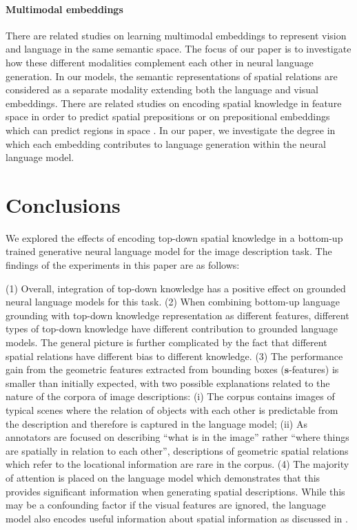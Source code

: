 \paragraph{Multimodal embeddings} %
There are related studies on learning multimodal embeddings
\cite{kiros2014multimodal,lazaridou2015combining} to represent vision
and language in the same semantic space.  The focus of our paper is
to investigate how these different modalities complement each other in
neural language generation. In our models, the semantic
representations of spatial relations are considered as a separate
modality extending both the language and visual embeddings.  There are
related studies on encoding spatial knowledge in feature space in
order to predict spatial prepositions \cite{ramisa2015combining} or on
prepositional embeddings which can predict regions in space
\cite{collell2018learning}.  In our paper, we investigate the degree
in which each embedding contributes to language generation within the
neural language model.



\section{Conclusions}\label{inlg2019:sec:conclusion}



We explored the effects of encoding top-down spatial knowledge in a
bottom-up trained generative neural language model for the image
description task.
The findings of the experiments in this paper are as follows:


(1)
 Overall, integration of top-down knowledge has a positive
  effect on grounded neural language models for this
  task. %
(2)
 When combining bottom-up language grounding with top-down
  knowledge representation as different features, different types of
  top-down knowledge have different contribution to grounded language
  models. The general picture is further complicated by the fact that
  different spatial relations have different bias to different
  knowledge.
(3)
 The performance gain from the geometric features extracted
  from bounding boxes ($\bm{s}$-features) is smaller than initially
  expected, with two possible explanations related to the nature of
  the corpora of image descriptions: (i) The corpus contains images of
  typical scenes where the relation of objects with each other is
  predictable from the description and therefore is captured in the
  language model; (ii) As annotators are focused on describing ``what
  is in the image'' rather ``where things are spatially in relation to
  each other'', descriptions of geometric spatial relations which
  refer to the locational information are rare in the corpus.
(4)
 The majority of attention is placed on the language model
  which demonstrates that this provides significant information when
  generating spatial descriptions. While this may be a confounding
  factor if the visual features are ignored, the language model also
  encodes useful information about spatial information as discussed in
  \cite{kulkarni2011baby,dobnik-etal-2018-exploring}.


